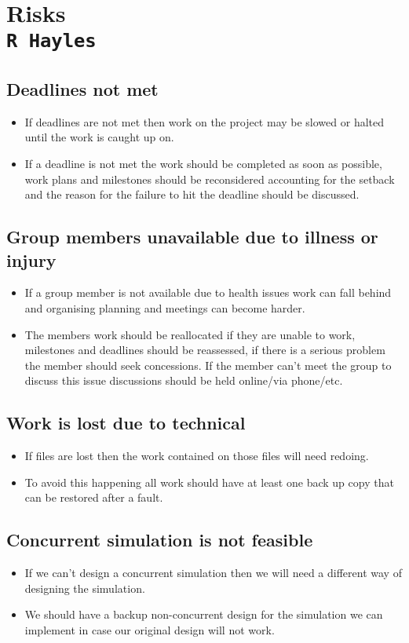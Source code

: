 \pagestyle{empty}

\section{Risks\\{\small\tt R~Hayles}}
\subsection{Deadlines not met}
\begin{itemize}
\item If deadlines are not met then work on the project may be slowed or halted  until the work is caught up on.
\item If a deadline is not met the work should be completed as soon as possible, work plans and milestones should be reconsidered accounting for the setback and the reason for the failure to hit the deadline should be discussed.
\end{itemize}
\subsection{Group members unavailable due to illness or injury}
\begin{itemize}
\item If a group member is not available due to health issues work can fall behind and organising planning and meetings can become harder.
\item The members work should be reallocated if they are unable to work, milestones and deadlines should be reassessed, if there is a serious problem the member should seek concessions. If the member can't meet the group to discuss this issue discussions should be held online/via phone/etc.
\end{itemize}
\subsection{Work is lost due to technical}
\begin{itemize}
\item If files are lost then the work contained on those files will need redoing.
\item To avoid this happening all work should have at least one back up copy that can be restored after a fault.
\end{itemize}
\subsection{Concurrent simulation is not feasible}
\begin{itemize}
\item If we can't design a concurrent simulation then we will need a different way of designing the simulation.
\item We should have a backup non-concurrent design for the simulation we can implement in case our original design will not work.
\end{itemize}
\clearpage
\endinput

